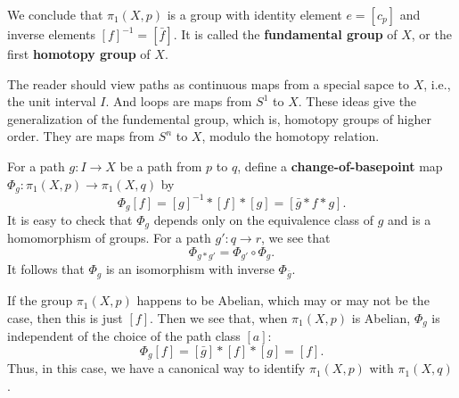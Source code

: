 We conclude that $\pi_1(X,p)$ is a group with identity element $e=[c_p]$ and inverse elements $[f]^{-1}=[\bar{f}]$. It is called the \textbf{fundamental group} of $X$, or the first \textbf{homotopy group} of $X$.
\begin{remark}
The reader should view paths as continuous maps from a special sapce to $X$, i.e., the unit interval $I$. And loops are maps from $S^1$ to $X$. These ideas give the generalization of the fundemental group, which is, homotopy groups of higher order. They are maps from $S^n$ to $X$, modulo the homotopy relation.
\end{remark}
\begin{remark}
For a path $g:I\to X$ be a path from $p$ to $q$, define a \textbf{change-of-basepoint} map $\varPhi_{g}:\pi_1(X,p)\to\pi_1(X,q)$ by \[\varPhi_{g}[f]=[g]^{-1}\ast[f]\ast[g]=[\bar{g}\ast f\ast g].\]
It is easy to check that $\varPhi_{g}$ depends only on the equivalence class of $g$ and is a homomorphism of groups. For a path $g':q\to r$, we see that \[\varPhi_{g\ast g'}=\varPhi_{g'}\circ\varPhi_{g}.\]
It follows that $\varPhi_{g}$ is an isomorphism with inverse $\varPhi_{\bar{g}}$.\par
If the group $\pi_1(X,p)$ happens to be Abelian, which may or may not be the case, then this is just $[f]$. Then we see that, when $\pi_1(X,p)$ is Abelian, $\varPhi_{g}$ is independent of the choice of the path class $[a]$:
\[\varPhi_{g}[f]=[\bar{g}]\ast[f]\ast[g]=[f].\]
Thus, in this case, we have a canonical way to identify $\pi_1(X,p)$ with $\pi_1(X,q)$.
\end{remark}
